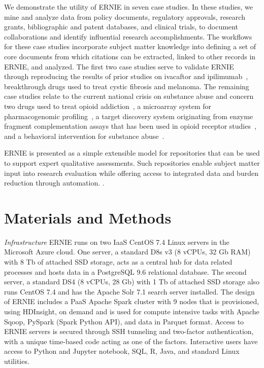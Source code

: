 \documentclass[review]{elsarticle}
\begin{document}
We demonstrate the utility of ERNIE in seven case studies. In these studies, we mine and analyze data from policy documents, regulatory approvals, research grants, bibliographic and patent databases, and clinical trials, to document collaborations and identify influential research accomplishments. The workflows for these case studies incorporate subject matter knowledge into defining a set of core documents from which citations can be extracted, linked to other records in ERNIE, and analyzed. The first two case studies serve to validate ERNIE through reproducing the results of prior studies on ivacaftor and ipilimumab~\cite{Williams2015}, breakthrough drugs used to treat cystic fibrosis and melanoma. The remaining case studies relate to the current national crisis on substance abuse and concern two drugs used to treat opioid addiction~\cite{Blumberg1973, Cowan1977}, a microarray system for pharmacogenomic profiling~\cite{deLeon2006}, a target discovery system originating from enzyme fragment complementation assays that has been used in opioid receptor studies~\cite{Khanna1989}, and a behavioral intervention for substance abuse~\cite{Botvin1980}. 

ERNIE is presented as a simple extensible model for repositories that can be used to support expert qualitative assessments. Such repositories enable subject matter input into research evaluation while offering access to integrated data and burden reduction through automation. .

\section*{Materials and Methods}

\emph{Infrastructure} ERNIE runs on two IaaS CentOS 7.4 Linux servers in the Microsoft Azure cloud. One server, a standard D8s v3 (8 vCPUs, 32 Gb RAM) with 8 Tb of attached SSD storage, acts as a central hub for data related processes and hosts data in a PostgreSQL 9.6 relational database. The second server, a standard DS4 (8 vCPUs, 28 Gb) with 1 Tb of attached SSD storage also runs CentOS 7.4 and has the Apache Solr 7.1 search server installed. The design of ERNIE includes a PaaS Apache Spark cluster with 9 nodes  that is provisioned, using HDInsight, on demand and  is used for compute intensive tasks with Apache Sqoop, PySpark (Spark Python API), and data in Parquet format. Access to ERNIE servers is secured through SSH tunneling and two-factor authentication, with a unique time-based code acting as one of the factors. Interactive users have access to Python and Jupyter notebook, SQL, R, Java, and standard Linux utilities. 
\end{document}
